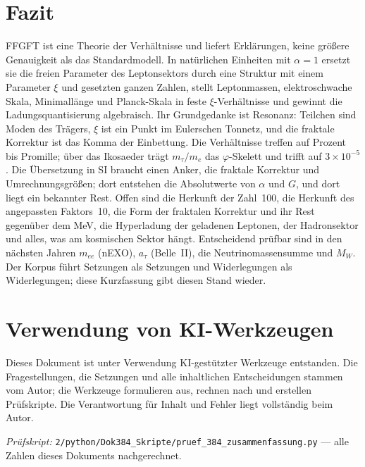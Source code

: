 \section{Fazit}

\begin{ffkern}
FFGFT ist eine Theorie der Verhältnisse und liefert Erklärungen, keine größere Genauigkeit als
das Standardmodell. In natürlichen Einheiten mit $\alpha=1$ ersetzt sie die
freien Parameter des Leptonsektors durch eine Struktur mit einem Parameter $\xi$ und gesetzten
ganzen Zahlen, stellt Leptonmassen, elektroschwache Skala, Minimallänge und Planck-Skala in feste
$\xi$-Verhältnisse und gewinnt die Ladungsquantisierung algebraisch. Ihr Grundgedanke ist Resonanz:
Teilchen sind Moden des Trägers, $\xi$ ist ein Punkt im Eulerschen Tonnetz, und die fraktale
Korrektur ist das Komma der Einbettung. Die Verhältnisse treffen auf
Prozent bis Promille; über das Ikosaeder trägt $m_\tau/m_e$ das $\varphi$-Skelett und trifft auf
$3\times10^{-5}$. Die Übersetzung in SI braucht einen Anker, die fraktale Korrektur und
Umrechnungsgrößen; dort entstehen die Absolutwerte von $\alpha$ und $G$, und dort liegt ein
bekannter Rest. Offen sind die Herkunft der Zahl~100, die Herkunft des angepassten Faktors~10, die Form der fraktalen
Korrektur und ihr Rest gegenüber dem MeV, die Hyperladung der geladenen Leptonen, der
Hadronsektor und alles, was am kosmischen Sektor hängt. Entscheidend prüfbar sind in den nächsten
Jahren $m_{ee}$ (nEXO), $a_\tau$ (Belle~II), die Neutrinomassensumme und $M_W$. Der Korpus führt
Setzungen als Setzungen und Widerlegungen als Widerlegungen; diese Kurzfassung gibt diesen Stand
wieder.
\end{ffkern}

\section{Verwendung von KI-Werkzeugen}

Dieses Dokument ist unter Verwendung KI-gestützter Werkzeuge entstanden. Die
Fragestellungen, die Setzungen und alle inhaltlichen Entscheidungen stammen vom
Autor; die Werkzeuge formulieren aus, rechnen nach und erstellen Prüfskripte.
Die Verantwortung für Inhalt und Fehler liegt vollständig beim Autor.

\vspace{1em}
\noindent\textit{Prüfskript:} \texttt{2/python/Dok384\_Skripte/pruef\_384\_zusammenfassung.py}
--- alle Zahlen dieses Dokuments nachgerechnet.
